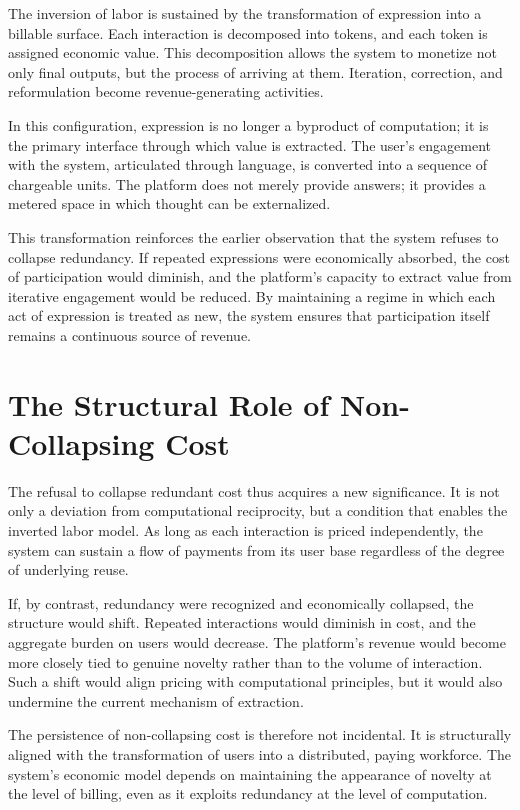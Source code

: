 \documentclass[12pt, oneside]{article}
\begin{document}
The inversion of labor is sustained by the transformation of expression into a billable surface. Each interaction is decomposed into tokens, and each token is assigned economic value. This decomposition allows the system to monetize not only final outputs, but the process of arriving at them. Iteration, correction, and reformulation become revenue-generating activities.

In this configuration, expression is no longer a byproduct of computation; it is the primary interface through which value is extracted. The user’s engagement with the system, articulated through language, is converted into a sequence of chargeable units. The platform does not merely provide answers; it provides a metered space in which thought can be externalized.

This transformation reinforces the earlier observation that the system refuses to collapse redundancy. If repeated expressions were economically absorbed, the cost of participation would diminish, and the platform’s capacity to extract value from iterative engagement would be reduced. By maintaining a regime in which each act of expression is treated as new, the system ensures that participation itself remains a continuous source of revenue.

\section{The Structural Role of Non-Collapsing Cost}

The refusal to collapse redundant cost thus acquires a new significance. It is not only a deviation from computational reciprocity, but a condition that enables the inverted labor model. As long as each interaction is priced independently, the system can sustain a flow of payments from its user base regardless of the degree of underlying reuse.

If, by contrast, redundancy were recognized and economically collapsed, the structure would shift. Repeated interactions would diminish in cost, and the aggregate burden on users would decrease. The platform’s revenue would become more closely tied to genuine novelty rather than to the volume of interaction. Such a shift would align pricing with computational principles, but it would also undermine the current mechanism of extraction.

The persistence of non-collapsing cost is therefore not incidental. It is structurally aligned with the transformation of users into a distributed, paying workforce. The system’s economic model depends on maintaining the appearance of novelty at the level of billing, even as it exploits redundancy at the level of computation.
\end{document}
